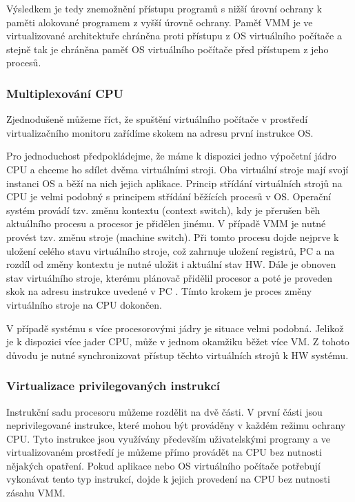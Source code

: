 Výsledkem je tedy znemožnění přístupu programů s nižší úrovní ochrany k paměti alokované programem z vyšší úrovně ochrany. Paměť VMM je ve virtualizované architektuře chráněna proti přístupu z OS virtuálního počítače a stejně tak je
chráněna paměť OS virtuálního počítače před přístupem z jeho procesů.

\subsubsection{Multiplexování CPU}

Zjednodušeně můžeme říct, že spuštění virtuálního počítače v prostředí virtualizačního monitoru zařídíme skokem na adresu první instrukce OS.

Pro jednoduchost předpokládejme, že máme k dispozici jedno výpočetní jádro CPU a chceme ho sdílet dvěma virtuálními stroji. Oba virtuální stroje mají svojí instanci OS a běží na nich jejich aplikace. Princip střídání virtuálních strojů
na CPU je velmi podobný s principem střídání běžících procesů v OS. Operační systém provádí tzv. změnu kontextu (context switch), kdy je přerušen běh aktuálního procesu a procesor je přidělen jinému. V případě VMM je nutné provést tzv. změnu stroje (machine switch).
Při tomto procesu dojde nejprve k uložení celého stavu virtuálního stroje, což zahrnuje uložení registrů, PC a na rozdíl od změny kontextu je nutné uložit i aktuální stav HW. Dále je obnoven stav virtuálního stroje, kterému plánovač přidělil procesor
a poté je proveden skok na adresu instrukce uvedené v PC \cite{vmm_book}. Tímto krokem je proces změny virtuálního stroje na CPU dokončen.

V případě systému s více procesorovými jádry je situace velmi podobná. Jelikož je k dispozici více jader CPU, může v jednom okamžiku běžet více VM. Z tohoto důvodu je nutné synchronizovat přístup těchto virtuálních strojů k HW systému.

\subsubsection{Virtualizace privilegovaných instrukcí}

Instrukční sadu procesoru můžeme rozdělit na dvě části. V první části jsou neprivilegované instrukce, které mohou být prováděny v každém režimu ochrany CPU. Tyto instrukce jsou využívány především uživatelskými programy a ve virtualizovaném
prostředí je můžeme přímo provádět na CPU bez nutnosti nějakých opatření. Pokud aplikace nebo OS virtuálního počítače potřebují vykonávat tento typ instrukcí, dojde k jejich provedení na CPU bez nutnosti zásahu VMM.

